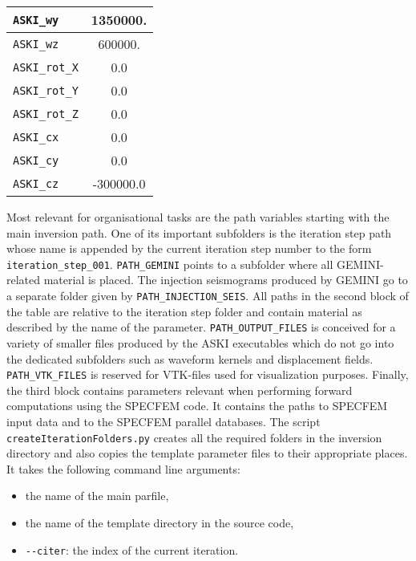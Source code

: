 \begin{longtable}{|p{10.0cm}|c|}
   \verb+ASKI_wy+                        &   1350000.                      \\ \hline
   \verb+ASKI_wz+                        &    600000.                      \\ \hline
   \verb+ASKI_rot_X+                     &   0.0                           \\ \hline
   \verb+ASKI_rot_Y+                     &   0.0                           \\ \hline
   \verb+ASKI_rot_Z+                     &   0.0                           \\ \hline
   \verb+ASKI_cx+                        &   0.0                           \\ \hline
   \verb+ASKI_cy+                        &   0.0                           \\ \hline
   \verb+ASKI_cz+                        &   -300000.0                     \\ \hline
 \end{longtable}
%
 Most relevant for organisational tasks are the path variables starting with the main inversion path. One of its important subfolders is the iteration step path whose name is appended by the current iteration step number to the form \verb+iteration_step_001+. \verb+PATH_GEMINI+ points to a subfolder where all GEMINI-related material is placed. The injection seismograms produced by GEMINI go to a separate folder given by \verb+PATH_INJECTION_SEIS+. All paths in the second block of the table are relative to the iteration step folder and contain material as described by the name of the parameter. \verb+PATH_OUTPUT_FILES+ is conceived for a variety of smaller files produced by the ASKI executables which do not go into the dedicated subfolders such as waveform kernels and displacement fields. \verb+PATH_VTK_FILES+ is reserved for VTK-files used for visualization purposes. Finally, the third block contains parameters relevant when performing forward computations using the SPECFEM code. It contains the paths to SPECFEM input data and to the SPECFEM parallel databases. The script \verb+createIterationFolders.py+ creates all the required folders in the inversion directory and also copies the template parameter files to their appropriate places. It takes the following command line arguments:
 \begin{itemize}
	\setlength{\itemsep}{-0.1cm}
   \item the name of the main parfile,
   \item the name of the template directory in the source code,
   \item \verb+--citer+: the index of the current iteration.
 \end{itemize}
